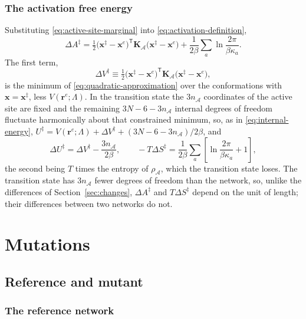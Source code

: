 \documentclass[11pt]{article}
\newcommand{\rr}{\mathbf{r}}
\newcommand{\KK}{\mathbf{K}}
\newcommand{\LL}{\Lambda}
\newcommand{\re}{\rr^{e}}
\newcommand{\xx}{\mathbf{x}}
\newcommand{\cA}{\mathcal{A}}
\newcommand{\nA}{n_{\cA}}
\newcommand{\KA}{\KK_{\cA}}
\newcommand{\xts}{\xx^{\ddagger}}
\begin{document}
\subsubsection{The activation free energy}

Substituting \eqref{eq:active-site-marginal} into \eqref{eq:activation-definition},
\begin{equation}
\boxed{
\Delta A^{\ddagger} = \tfrac12 \big(\xts - \xx^{e}\big)^{\mathsf T}\KA\big(\xts - \xx^{e}\big)
+ \frac{1}{2\beta} \sum_{a} \ln \frac{2\pi}{\beta\kappa_a} .
}
\label{eq:activation-free-energy}
\end{equation}
The first term,
\begin{equation}
\Delta V^{\ddagger} \equiv \tfrac12 \big(\xts - \xx^{e}\big)^{\mathsf T}\KA\big(\xts - \xx^{e}\big),
\label{eq:activation-energy}
\end{equation}
is the minimum of \eqref{eq:quadratic-approximation} over the conformations with $\xx = \xts$, less $V(\re;\LL)$.
In the transition state the $3\nA$ coordinates of the active site are fixed and the remaining $3N-6-3\nA$ internal degrees of freedom fluctuate harmonically about that constrained minimum, so, as in \eqref{eq:internal-energy}, $U^{\ddagger} = V(\re;\LL) + \Delta V^{\ddagger} + (3N-6-3\nA)/2\beta$, and
\begin{equation}
\Delta U^{\ddagger} = \Delta V^{\ddagger} - \frac{3\nA}{2\beta},
\qquad
-T\Delta S^{\ddagger} = \frac{1}{2\beta} \sum_{a} \left[\ln\frac{2\pi}{\beta\kappa_a} + 1\right] ,
\label{eq:activation-energy-entropy}
\end{equation}
the second being $T$ times the entropy of $\rho_{\cA}$, which the transition state loses.
The transition state has $3\nA$ fewer degrees of freedom than the network, so, unlike the differences of Section~\ref{sec:changes}, $\Delta A^{\ddagger}$ and $T\Delta S^{\ddagger}$ depend on the unit of length; their differences between two networks do not.

\section{Mutations}
\label{sec:mutation}

\subsection{Reference and mutant}

\subsubsection{The reference network}
\end{document}
